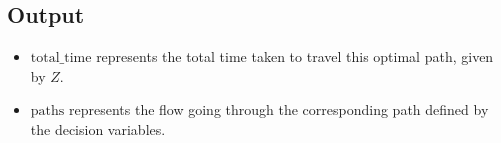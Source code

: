 \documentclass{article}
\begin{document}
\subsection*{Output}
\begin{itemize}
    \item $\text{total\_time}$ represents the total time taken to travel this optimal path, given by $Z$.
    \item $\text{paths}$ represents the flow going through the corresponding path defined by the decision variables.
\end{itemize}
\end{document}
